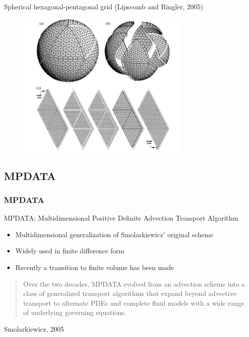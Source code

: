 \documentclass[hyperref={pdfstartview=Fit,pdfpagemode=FullScreen}]{beamer}
\newcommand{\imsize}{}
\begin{document}
\begin{frame}
Spherical hexagonal-pentagonal grid (Lipscomb and Ringler, 2005) 
\begin{figure}
\renewcommand{\imsize}{0.75\textwidth}
\includegraphics[width=\imsize]{lipcomb}%
\end{figure}
\end{frame}

\subsection{MPDATA}

\begin{frame}
\frametitle{MPDATA}

MPDATA: Multidimensional Positive Definite Advection Transport Algorithm

\begin{itemize}
\item Multidimensional generalization of Smolarkiewicz' original scheme
\item Widely used in finite difference form
\item Recently a transition to finite volume has been made
\end{itemize}

\begin{quotation}
Over the two decades, MPDATA evolved from an advection scheme into a class of generalized transport algorithms that expand beyond advective transport to alternate PDEs and complete fluid models with a wide range of underlying governing equations. 
\end{quotation} 
\begin{center}Smolarkiewicz, 2005\end{center}
\end{frame}
\end{document}
